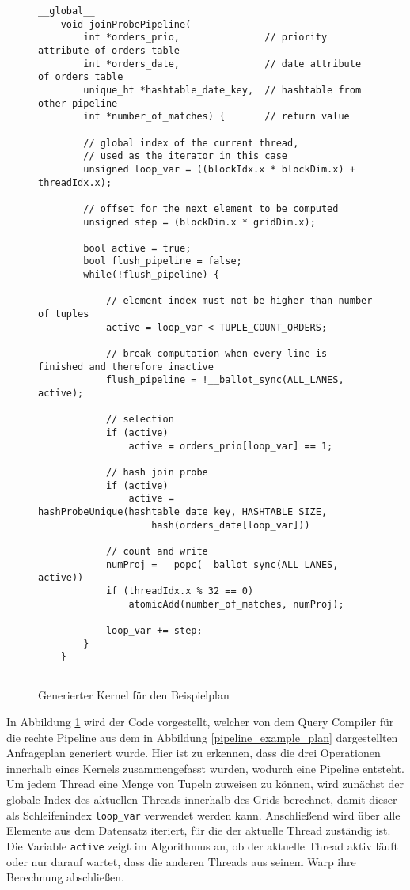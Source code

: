 \begin{figure}[h]
	\begin{lstlisting}[language=MyC++,
	linebackgroundcolor={%
	\ifnum\value{lstnumber}>24
		\ifnum\value{lstnumber}<28
			\color{red!25}
		\fi
	\fi
	\ifnum\value{lstnumber}>28
		\ifnum\value{lstnumber}<33
			\color{green!25}
		\fi
	\fi
	\ifnum\value{lstnumber}>33
		\ifnum\value{lstnumber}<38
			\color{yellow!25}
		\fi
	\fi
	}]
	__global__
	void joinProbePipeline(
		int *orders_prio,              	// priority attribute of orders table
		int *orders_date,               // date attribute of orders table
		unique_ht *hashtable_date_key,  // hashtable from other pipeline
		int *number_of_matches) {       // return value
		
		// global index of the current thread,
		// used as the iterator in this case
		unsigned loop_var = ((blockIdx.x * blockDim.x) + threadIdx.x);
		
		// offset for the next element to be computed
		unsigned step = (blockDim.x * gridDim.x);
		
		bool active = true;
		bool flush_pipeline = false;
		while(!flush_pipeline) {
		
			// element index must not be higher than number of tuples
			active = loop_var < TUPLE_COUNT_ORDERS;
			
			// break computation when every line is finished and therefore inactive
			flush_pipeline = !__ballot_sync(ALL_LANES, active);
			
			// selection
			if (active)
				active = orders_prio[loop_var] == 1;
			
			// hash join probe
			if (active)
				active = hashProbeUnique(hashtable_date_key, HASHTABLE_SIZE, 
					hash(orders_date[loop_var]))
			
			// count and write
			numProj = __popc(__ballot_sync(ALL_LANES, active))
			if (threadIdx.x % 32 == 0)
				atomicAdd(number_of_matches, numProj);
			
			loop_var += step;
		}
	}
	
	\end{lstlisting}
	\caption{Generierter Kernel für den Beispielplan}
	\label{pipelining_example_code}
\end{figure}

In Abbildung \ref{pipelining_example_code} wird der Code vorgestellt, welcher von dem Query Compiler für die rechte Pipeline aus dem in Abbildung \ref{pipeline_example_plan} dargestellten Anfrageplan generiert wurde.
Hier ist zu erkennen, dass die drei Operationen innerhalb eines Kernels zusammengefasst wurden, wodurch eine Pipeline entsteht.
Um jedem Thread eine Menge von Tupeln zuweisen zu können, wird zunächst der globale Index des aktuellen Threads innerhalb des Grids berechnet, damit dieser als Schleifenindex \texttt{loop\_var} verwendet werden kann.
Anschließend wird über alle Elemente aus dem Datensatz iteriert, für die der aktuelle Thread zuständig ist.
Die Variable \texttt{active} zeigt im Algorithmus an, ob der aktuelle Thread aktiv läuft oder nur darauf wartet, dass die anderen Threads aus seinem Warp ihre Berechnung abschließen.

